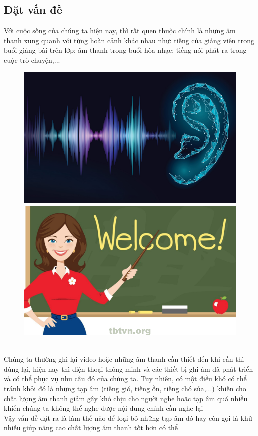 \subsection{Đặt vấn đề}
Với cuộc sống của chúng ta hiện nay, thì rất quen thuộc chính là những âm thanh xung quanh với từng hoàn cảnh khác nhau như: tiếng của giảng viên trong buổi giảng bài trên lớp; âm thanh trong buổi hòa nhạc; tiếng nói phát ra trong cuộc trò chuyện,...
\\
\begin{figure}[!ht]
	\begin{minipage}[b]{0.4\textwidth}
		\centering
		\includegraphics[scale=0.125]{amthanh}
	\end{minipage}
	\hfill
	\begin{minipage}[b]{0.4\textwidth}
		\centering
		\includegraphics[scale=0.28]{amthanh2}
	\end{minipage}
\end{figure}\\
Chúng ta thường ghi lại video hoặc những âm thanh cần thiết đến khi cần thì dùng lại, hiện nay thì điện thoại thông minh và các thiết bị ghi âm đã phát triển và có thể phục vụ nhu cầu đó của chúng ta. Tuy nhiên, có một điều khó có thể tránh khỏi đó là những tạp âm (tiếng gió, tiếng ồn, tiếng chó sủa,...) khiến cho chất lượng âm thanh giảm gây khó chịu cho người nghe hoặc tạp âm quá nhiều khiến chúng ta không thể nghe được nội dung chính cần nghe lại\\
Vậy vấn đề đặt ra là làm thế nào để loại bỏ những tạp âm đó hay còn gọi là khử nhiễu giúp nâng cao chất lượng âm thanh tốt hơn có thể\\

